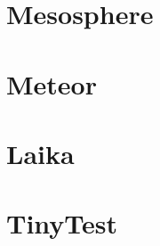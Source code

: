\documentclass[brudnopis]{xmgr}
\begin{document}
\summary

\appendix
\chapter{Mesosphere}


\chapter{Meteor}


\chapter{Laika}


\chapter{TinyTest}







\listoftables

\listoffigures

\oswiadczenie
\end{document}
